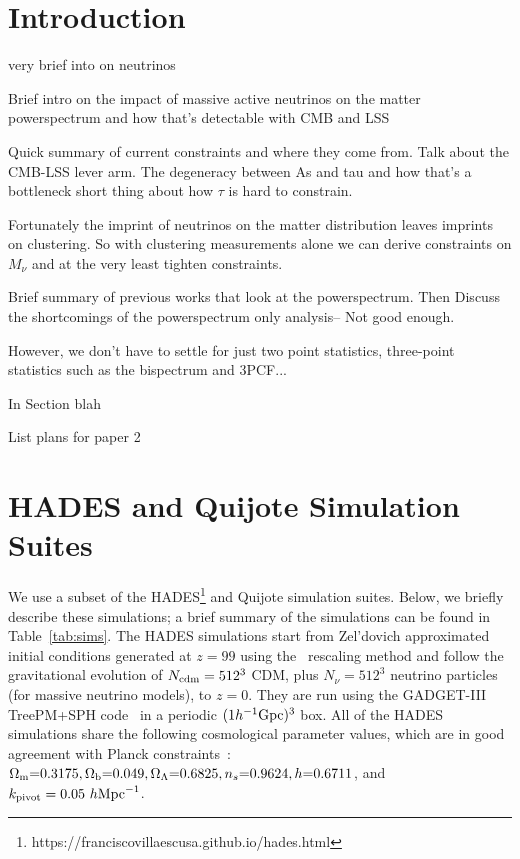 \documentclass[12pt, letterpaper, preprint]{aastex62}
\newcommand{\Om}{\Omega_{\rm m}}
\newcommand{\Ob}{\Omega_{\rm b}}
\newcommand{\OL}{\Omega_\Lambda}
\newcommand{\smnu}{M_\nu}
\newcommand{\ch}[1]{{\color{orange}{\bf CH:} #1}}
\begin{document}

\section{Introduction}
very brief into on neutrinos

Brief intro on the impact of massive active neutrinos on the matter powerspectrum 
and how that's detectable with CMB and LSS

Quick summary of current constraints and where they come from. Talk about the 
CMB-LSS lever arm. The degeneracy between As and tau and how that's a bottleneck
short thing about how $\tau$ is hard to constrain.

Fortunately the imprint of neutrinos on the matter distribution leaves imprints
on clustering. So with clustering measurements alone we can derive constraints 
on $\smnu$ and at the very least tighten constraints.  

Brief summary of previous works that look at the powerspectrum. Then Discuss the 
shortcomings of the powerspectrum only analysis-- Not good enough. 

However, we don't have to settle for just two point statistics, three-point 
statistics such as the bispectrum and 3PCF... 

In Section blah 

\ch{List plans for paper 2}

\section{HADES and Quijote Simulation Suites} \label{sec:hades} 
We use a subset of the HADES\footnote{https://franciscovillaescusa.github.io/hades.html} 
and Quijote simulation suites. Below, we briefly describe these simulations; 
a brief summary of the simulations can be found in Table~\ref{tab:sims}. 
The HADES simulations start from Zel'dovich approximated initial conditions 
generated at $z=99$ using the~\cite{zennaro2017a} rescaling method and follow 
the gravitational evolution of $N_{\rm cdm}=512^3$ CDM, plus $N_{\nu}=512^3$ 
neutrino particles (for massive neutrino models), to $z=0$. They are run using 
the {\sc GADGET-III} TreePM+SPH code~\citep{springel2005} in a periodic 
$(1 h^{-1}{\rm Gpc})^3$ box. All of the HADES simulations share the following 
cosmological parameter values, which are in good agreement with Planck 
constraints~\cite{ade2016a}: $\Om{=}0.3175, \Ob{=}0.049, \OL{=}0.6825, n_s{=}0.9624, h{=}0.6711$, 
and $k_{\rm pivot} = 0.05~h{\rm Mpc}^{-1}$. 
\end{document}
